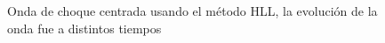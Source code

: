 \documentclass[12pt,a4paper]{book}
\begin{document}
\begin{figure}[H]
\centering
{}
\caption{Onda de choque centrada usando el método HLL, la evolución de la onda fue a distintos tiempos} \label{fig:HLL-prueba1}
\end{figure}
\end{document}
